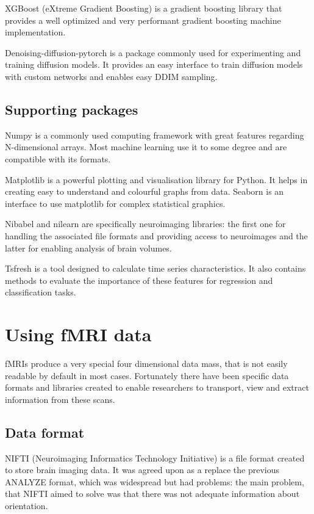 	XGBoost (eXtreme Gradient Boosting) is a gradient boosting library that provides a well optimized and very performant gradient boosting machine implementation.
	
	Denoising-diffusion-pytorch is a package commonly used for experimenting and training diffusion models. It provides an easy interface to train diffusion models with custom networks and enables easy DDIM sampling.
	
	
	\subsection{Supporting packages}
	Numpy is a commonly used computing framework with great features regarding N-dimensional arrays. Most machine learning use it to some degree and are compatible with its formats.
	
	Matplotlib is a powerful plotting and visualisation library for Python. It helps in creating easy to understand and colourful graphs from data. Seaborn is an interface to use matplotlib for complex statistical graphics.
	
	Nibabel and nilearn are specifically neuroimaging libraries: the first one for handling the associated file formats and providing access to neuroimages and the latter for enabling analysis of brain volumes.
	
	Tsfresh is a tool designed to calculate time series characteristics. It also contains methods to evaluate the importance of these features for regression and classification tasks.
	
	
\section{Using fMRI data}

	fMRIs produce a very special four dimensional data mass, that is not easily readable by default in most cases. Fortunately there have been specific data formats and libraries created to enable researchers to transport, view and extract information from these scans.

	\subsection{Data format}
	
	NIFTI (Neuroimaging Informatics Technology Initiative) is a file format created to store brain imaging data\cite{nifti}. It was agreed upon as a replace the previous ANALYZE format, which was widespread but had problems: the main problem, that NIFTI aimed to solve was that there was not adequate information about orientation.
	
